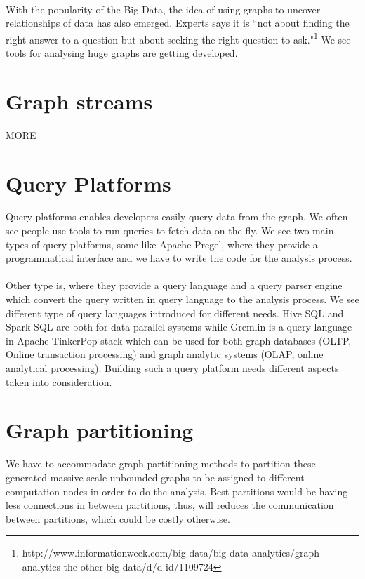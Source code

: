\documentclass[12pt]{report}
\numberwithin{figure}{section}
\numberwithin{table}{section}
\begin{document}
\paragraph{}

With the popularity of the Big Data, the idea of using graphs to uncover relationships of data has also emerged. Experts says it is “not about finding the right answer to a question but about seeking the right question to ask."\footnote{http://www.informationweek.com/big-data/big-data-analytics/graph-analytics-the-other-big-data/d/d-id/1109724} We see tools for analysing huge graphs are getting developed.

\section{Graph streams}
MORE
\section{Query Platforms}
Query platforms enables developers easily query data from the graph. We often see people use tools to run queries to fetch data on the fly. We see two main types of query platforms, some like Apache Pregel, where they provide a programmatical interface and we have to write the code for the analysis process. 

\paragraph{}

Other type is, where they provide a query language and a query parser engine which convert the query written in query language to the analysis process. We see different type of query languages introduced for different needs. Hive SQL and Spark SQL are both for data-parallel systems while Gremlin is a query language in Apache TinkerPop stack which can be used for both graph databases (OLTP, Online transaction processing) and graph analytic systems (OLAP, online analytical processing). Building such a query platform needs different aspects taken into consideration. 

\section{Graph partitioning}
We have to accommodate graph partitioning methods to partition these generated massive-scale unbounded graphs to be assigned to  different computation nodes in order to do the analysis. Best partitions would be having less connections in between partitions, thus, will reduces the communication between partitions, which could be costly otherwise.
\end{document}
